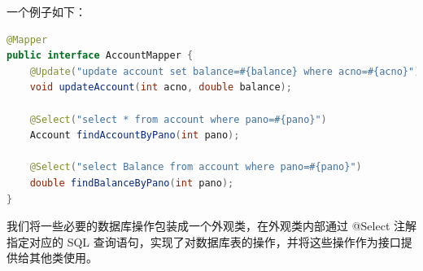 \documentclass[24pt,a4paper]{article}%
\begin{document}
一个例子如下：
\begin{lstlisting}[language=Java]
@Mapper
public interface AccountMapper {
    @Update("update account set balance=#{balance} where acno=#{acno}")
    void updateAccount(int acno, double balance);
    
    @Select("select * from account where pano=#{pano}")
    Account findAccountByPano(int pano);
    
    @Select("select Balance from account where pano=#{pano}")
    double findBalanceByPano(int pano);
}
\end{lstlisting}
我们将一些必要的数据库操作包装成一个外观类，在外观类内部通过 @Select 注解指定对应的 SQL 查询语句，实现了对数据库表的操作，并将这些操作作为接口提供给其他类使用。

\newpage
\end{document}
